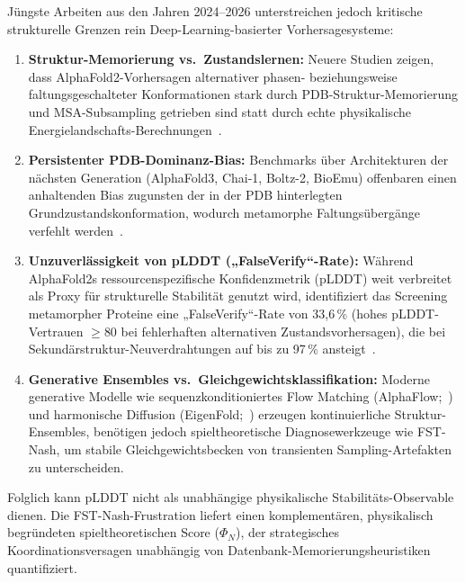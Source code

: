 \documentclass[12pt,a4paper]{article}
\theoremstyle{remark}
\begin{document}
Jüngste Arbeiten aus den Jahren 2024--2026 unterstreichen jedoch kritische strukturelle Grenzen rein Deep-Learning-basierter Vorhersagesysteme:
\begin{enumerate}
    \item \textbf{Struktur-Memorierung vs.\ Zustandslernen:} Neuere Studien zeigen, dass AlphaFold2-Vorhersagen alternativer phasen- beziehungsweise faltungsgeschalteter Konformationen stark durch PDB-Struktur-Memorierung und MSA-Subsampling getrieben sind statt durch echte physikalische Energielandschafts-Berechnungen~\citep{NatureComms2024}.
    \item \textbf{Persistenter PDB-Dominanz-Bias:} Benchmarks über Architekturen der nächsten Generation (AlphaFold3, Chai-1, Boltz-2, BioEmu) offenbaren einen anhaltenden Bias zugunsten der in der PDB hinterlegten Grundzustandskonformation, wodurch metamorphe Faltungsübergänge verfehlt werden~\citep{Ye2026}.
    \item \textbf{Unzuverlässigkeit von pLDDT („FalseVerify“-Rate):} Während AlphaFold2s ressourcenspezifische Konfidenzmetrik (pLDDT) weit verbreitet als Proxy für strukturelle Stabilität genutzt wird, identifiziert das Screening metamorpher Proteine eine „FalseVerify“-Rate von 33{,}6\,\% (hohes pLDDT-Vertrauen $\ge 80$ bei fehlerhaften alternativen Zustandsvorhersagen), die bei Sekundärstruktur-Neuverdrahtungen auf bis zu 97\,\% ansteigt~\citep{Thacker2026}.
    \item \textbf{Generative Ensembles vs.\ Gleichgewichtsklassifikation:} Moderne generative Modelle wie sequenzkonditioniertes Flow Matching (AlphaFlow;~\citealp{JingFlow2024}) und harmonische Diffusion (EigenFold;~\citealp{JingDiffusion2023}) erzeugen kontinuierliche Struktur-Ensembles, benötigen jedoch spieltheoretische Diagnosewerkzeuge wie FST-Nash, um stabile Gleichgewichtsbecken von transienten Sampling-Artefakten zu unterscheiden.
\end{enumerate}
Folglich kann pLDDT nicht als unabhängige physikalische Stabilitäts-Observable dienen. Die FST-Nash-Frustration liefert einen komplementären, physikalisch begründeten spieltheoretischen Score ($\Phi_N$), der strategisches Koordinationsversagen unabhängig von Datenbank-Memorierungsheuristiken quantifiziert.
\end{document}
